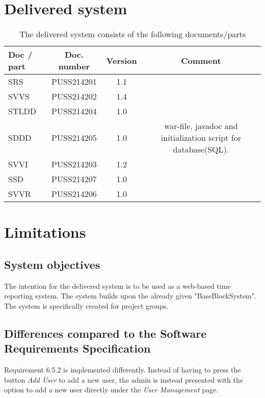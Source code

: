 \documentclass{article}
\begin{document}
\section{Delivered system}
 \begin{table}[h]
            \centering
            
             \caption{The delivered system consists of the following documents/parts}
            \begin{tabular}{|l|c|c|c|}
                \hline
                    \textbf{Doc / part} & \textbf{Doc.  number} & \textbf{Version} & \textbf{Comment} \\
                \hline
                    SRS & PUSS214201 & 1.1 &   \\
                 \hline
                    SVVS & PUSS214202 & 1.4 &  \\
                 \hline
                    STLDD & PUSS214204 & 1.0 &  \\
                 \hline
                    SDDD & PUSS214205  & 1.0 & war-file, javadoc and initialization script for database(SQL).   \\
                 \hline
                    SVVI & PUSS214203 & 1.2 &  \\
                 \hline
                    SSD & PUSS214207 & 1.0 &  \\
                 \hline
                    SVVR & PUSS214206 & 1.0 &  \\
                 \hline
                 
            \end{tabular}
           
            \label{activitytable}
        \end{table}

\section{Limitations}


\subsection{System objectives}
The intention for the delivered system is to be used as a web-based time reporting system. The system builds upon the already given "BaseBlockSystem". The system is specifically created for project groups.

\subsection{Differences compared to the Software Requirements Specification}
Requirement 6.5.2 is implemented differently. Instead of having to press  the button \textit{Add User} to add a new user, the admin is instead presented with the option to add a new user directly under the \textit{User Management} page.
\end{document}
